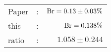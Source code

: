       \begin{tabular}{lcr}
          Paper &:& $\mathrm{Br}  = 0.13\pm 0.03\%$ \\
          this      &:& $\mathrm{Br}  = 0.138\%$ \\
		  ratio   &:& $1.058\pm 0.244$ \\
      \end{tabular}
